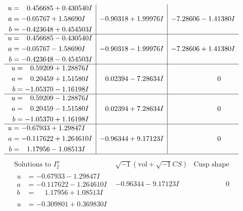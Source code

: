 \documentclass[1p]{elsarticle_modified}
\theoremstyle{definition}
\newcommand{\I}{\sqrt{-1}}
\begin{document}
$$\begin{array}{c|c|c}
\begin{aligned}
u &= \phantom{-}0.456685 + 0.430540 I \\
a &= -0.05767 + 1.58690 I \\
b &= -0.423648 + 0.454503 I\end{aligned}
 & -0.90318 + 1.99976 I & -7.28606 - 1.41380 I \\ \hline\begin{aligned}
u &= \phantom{-}0.456685 - 0.430540 I \\
a &= -0.05767 - 1.58690 I \\
b &= -0.423648 - 0.454503 I\end{aligned}
 & -0.90318 - 1.99976 I & -7.28606 + 1.41380 I \\ \hline\begin{aligned}
u &= \phantom{-}0.59209 + 1.28876 I \\
a &= \phantom{-}0.20459 + 1.51580 I \\
b &= -1.05370 - 1.16198 I\end{aligned}
 & \phantom{-}0.02394 - 7.28634 I & \phantom{-0.000000 } 0 \\ \hline\begin{aligned}
u &= \phantom{-}0.59209 - 1.28876 I \\
a &= \phantom{-}0.20459 - 1.51580 I \\
b &= -1.05370 + 1.16198 I\end{aligned}
 & \phantom{-}0.02394 + 7.28634 I & \phantom{-0.000000 } 0 \\ \hline\begin{aligned}
u &= -0.67933 + 1.29847 I \\
a &= -0.117622 + 1.264610 I \\
b &= \phantom{-}1.17956 - 1.08513 I\end{aligned}
 & -0.96344 + 9.17123 I & \phantom{-0.000000 } 0\\
 \hline 
 \end{array}$$\newpage$$\begin{array}{c|c|c}  
\text{Solutions to }I^u_{2}& \I (\text{vol} + \sqrt{-1}CS) & \text{Cusp shape}\\
 \hline 
\begin{aligned}
u &= -0.67933 - 1.29847 I \\
a &= -0.117622 - 1.264610 I \\
b &= \phantom{-}1.17956 + 1.08513 I\end{aligned}
 & -0.96344 - 9.17123 I & \phantom{-0.000000 } 0 \\ \hline\begin{aligned}
u &= -0.309801 + 0.369830 I \\

\end{aligned}
\end{array}$$
\end{document}
